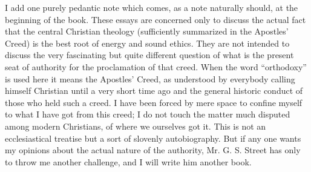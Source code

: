 I add one purely pedantic note which comes, as a note naturally should, at the beginning of the book. These essays are concerned only to discuss the actual fact that the central Christian theology (sufficiently summarized in the Apostles’ Creed) is the best root of energy and sound ethics. They are not intended to discuss the very fascinating but quite different question of what is the present seat of authority for the proclamation of that creed. When the word “orthodoxy” is used here it means the Apostles’ Creed, as understood by everybody calling himself Christian until a very short time ago and the general historic conduct of those who held such a creed. I have been forced by mere space to confine myself to what I have got from this creed; I do not touch the matter much disputed among modern Christians, of where we ourselves got it. This is not an ecclesiastical treatise but a sort of slovenly autobiography. But if any one wants my opinions about the actual nature of the authority, Mr. G. S. Street has only to throw me another challenge, and I will write him another book.


